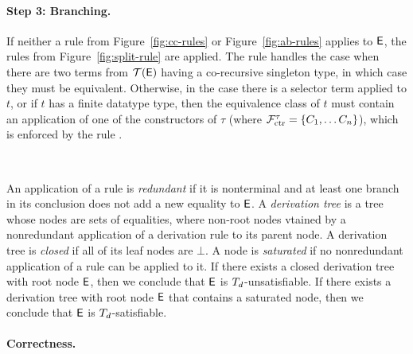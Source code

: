 \paragraph{Step 3: Branching.}
If neither a rule from Figure~\ref{fig:cc-rules} or Figure~\ref{fig:ab-rules} applies to $\mathsf{E}$, 
the rules from Figure~\ref{fig:split-rule} are applied.
The rule  handles the case when there are two terms from $\mathcal{T}(\mathsf{E})$ having a co-recursive singleton type,
in which case they must be equivalent.
Otherwise, in the case there is a selector term applied to $t$, or if $t$ has a finite datatype type, 
then the equivalence class of $t$ must contain an application of one of the constructors of $\tau$ (where $\mathcal{F}_{\mathrm{ctr}}^\tau = \{ C_1, \ldots C_n \}$), 
which is enforced by the rule .

\ 

An application of a rule is \emph{redundant} if it is nonterminal and at least one branch in its conclusion does not add a new equality to $\mathsf{E}$.
A \emph{derivation tree} is a tree whose nodes are sets of equalities, where non-root nodes vtained by 
a nonredundant application of a derivation rule to its parent node.
A derivation tree is \emph{closed} if all of its leaf nodes are $\bot$.
A node is \emph{saturated} if no nonredundant application of a rule can be applied to it.
If there exists a closed derivation tree with root node $\mathsf{E}$, then we conclude that $\mathsf{E}$ is $T_{d}$-unsatisfiable.
If there exists a derivation tree with root node $\mathsf{E}$ that contains a saturated node, then we conclude that $\mathsf{E}$ is $T_{d}$-satisfiable. 

\paragraph{Correctness.}

